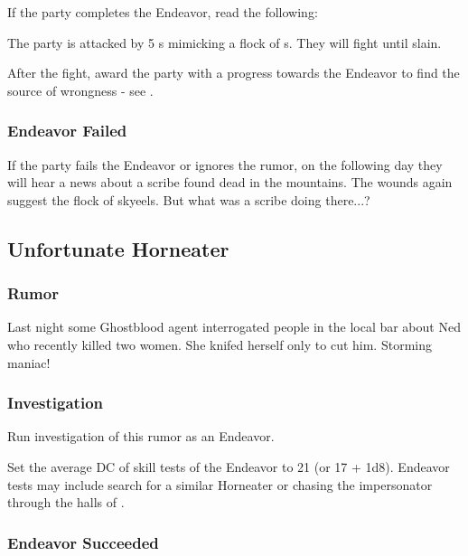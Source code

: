 If the party completes the Endeavor, read the following:


The party is attacked by 5 \enemyMidnightBeast{}s mimicking a flock of \enemySkyeel{}s. They will fight until slain.

After the fight, award the party with a progress towards the Endeavor to find the source of \locationUrithiru{} wrongness - see .

\subsubsection{Endeavor Failed}

If the party fails the Endeavor or ignores the rumor, on the following day they will hear a news about a scribe found dead in the mountains. The wounds again suggest the flock of skyeels. But what was a scribe doing there...?



\subsection{Unfortunate Horneater}

\subsubsection{Rumor}

Last night some Ghostblood agent interrogated people in the local bar about Ned who recently killed two women. She knifed herself only to cut him. Storming maniac!


\subsubsection{Investigation}

Run investigation of this rumor as an Endeavor. 

Set the average DC of skill tests of the Endeavor to 21 (or 17 + 1d8). Endeavor tests may include search for a similar Horneater or chasing the impersonator through the halls of \locationUrithiru{}.

\subsubsection{Endeavor Succeeded}

